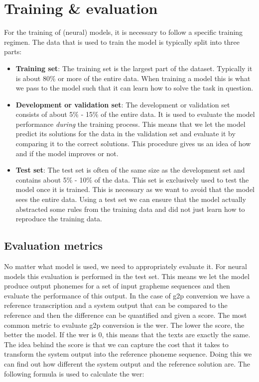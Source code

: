 \section{Training \& evaluation}
\label{sec:train-eval}
For the training of (neural) models, it is necessary to follow a specific training regimen. The data that is used to train the model is typically split into three parts:
\begin{itemize}
    \item \textbf{Training set}: The training set is the largest part of the dataset. Typically it is about 80\% or more of the entire data. When training a model this is what we pass to the model such that it can learn how to solve the task in question.
    \item \textbf{Development or validation set}: The development or validation set consists of about 5\% - 15\% of the entire data. It is used to evaluate the model performance \textit{during} the training process. This means that we let the model predict its solutions for the data in the validation set and evaluate it by comparing it to the correct solutions. This procedure gives us an idea of how and if the model improves or not.
    \item \textbf{Test set}: The test set is often of the same size as the development set and contains about 5\% - 10\% of the data. This set is exclusively used to test the model once it is trained. This is necessary as we want to avoid that the model sees the entire data. Using a test set we can ensure that the model actually abstracted some rules from the training data and did not just learn how to reproduce the training data.
\end{itemize}

\subsection*{Evaluation metrics}
No matter what model is used, we need to appropriately evaluate it. For neural models this evaluation is performed in the test set. This means we let the model produce output phonemes for a set of input grapheme sequences and then evaluate the performance of this output. In the case of \ac{g2p} conversion we have a reference transcription and a system output that can be compared to the reference and then the difference can be quantified and given a score. The most common metric to evaluate \ac{g2p} conversion is the \ac{wer}. The lower the score, the better the model. If the \ac{wer} is 0, this means that the texts are exactly the same. The idea behind the score is that we can capture the cost that it takes to transform the system output into the reference phoneme sequence. Doing this we can find out how different the system output and the reference solution are. The following formula is used to calculate the \ac{wer}:    

